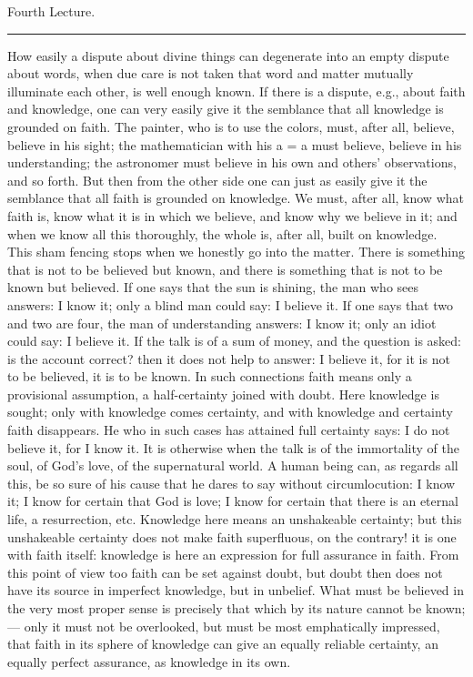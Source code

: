 \documentclass[12pt,a4paper,openany]{book}
\newcommand{\opage}[1]{\marginnote{\footnotesize\textit{[#1]}}}
\newcommand{\lecture}[1]{\clearpage\begin{center}{\large #1}\\[0.4em]\rule{3em}{0.4pt}\end{center}\medskip\noindent}
\begin{document}
\setcounter{footnote}{0}%
\lecture{Fourth Lecture.}\opage{43}

How easily a dispute about divine things can degenerate into an empty dispute about words, when due care is not taken that word and matter mutually illuminate each other, is well enough known. If there is a dispute, e.g., about faith and knowledge, one can very easily give it the semblance that all knowledge is grounded on faith. The painter, who is to use the colors, must, after all, believe, believe in his sight; the mathematician with his a = a must believe, believe in his understanding; the astronomer must believe in his own and others' observations, and so forth. But then from the other side one can just as easily give it the semblance that all faith is grounded on knowledge. We must, after all, know what faith is, know what it is in which we believe, and know why we believe in it; and when we know all this thoroughly, the whole is, after all, built on knowledge. This sham fencing stops when we honestly go into the matter. There is something that is not to be believed but known, and there is something that is not to be known but believed. If one says that the sun is shining, the man who sees answers: I know it; only a blind man could say: I believe it. If one says that two and two are four, the man of understanding answers: I know it; only an idiot could say: I believe it. If the talk is of a sum of money, and
\setcounter{footnote}{0}%
\opage{44}the question is asked: is the account correct? then it does not help to answer: I believe it, for it is not to be believed, it is to be known. In such connections faith means only a provisional assumption, a half-certainty joined with doubt. Here knowledge is sought; only with knowledge comes certainty, and with knowledge and certainty faith disappears. He who in such cases has attained full certainty says: I do not believe it, for I know it. It is otherwise when the talk is of the immortality of the soul, of God's love, of the supernatural world. A human being can, as regards all this, be so sure of his cause that he dares to say without circumlocution: I know it; I know for certain that God is love; I know for certain that there is an eternal life, a resurrection, etc. Knowledge here means an unshakeable certainty; but this unshakeable certainty does not make faith superfluous, on the contrary! it is one with faith itself: knowledge is here an expression for full assurance in faith. From this point of view too faith can be set against doubt, but doubt then does not have its source in imperfect knowledge, but in unbelief. What must be believed in the very most proper sense is precisely that which by its nature cannot be known; --- only it must not be overlooked, but must be most emphatically impressed, that faith in its sphere of knowledge can give an equally reliable certainty, an equally perfect assurance, as knowledge in its own.
\end{document}
